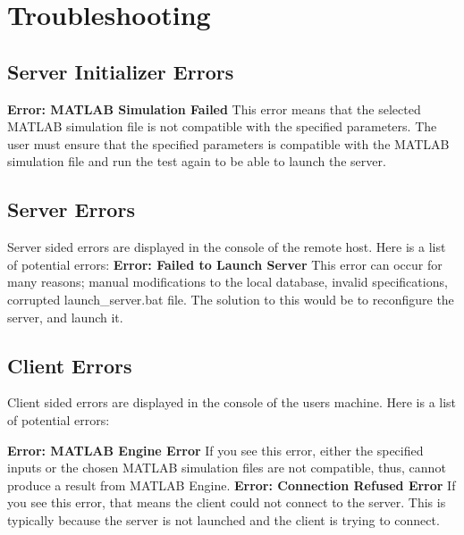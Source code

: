 \documentclass[12pt, titlepage]{article}
\begin{document}
\section{Troubleshooting}
\subsection{Server Initializer Errors}
\textbf{Error: MATLAB Simulation Failed}
\newline
This error means that the selected MATLAB simulation file is not compatible with the specified parameters. The user must ensure that the specified parameters is compatible with the MATLAB simulation file and run the test again to be able to launch the server.


\subsection{Server Errors}
Server sided errors are displayed in the console of the remote host. Here is a list of potential errors:
\newline
\newline
\textbf{Error: Failed to Launch Server}
\newline
This error can occur for many reasons; manual modifications to the local database, invalid specifications, corrupted launch\_server.bat file. The solution to this would be to reconfigure the server, and launch it.



\subsection{Client Errors}
Client sided errors are displayed in the console of the users machine. Here is a list of potential errors:
\newline
\newline

\textbf{Error: MATLAB Engine Error}
\newline
If you see this error, either the specified inputs or the chosen MATLAB simulation files are not compatible, thus, cannot produce a result from MATLAB Engine.
\newline
\newline
\textbf{Error: Connection Refused Error}
\newline
If you see this error, that means the client could not connect to the server. This is typically because the server is not launched and the client is trying to connect.
\end{document}
